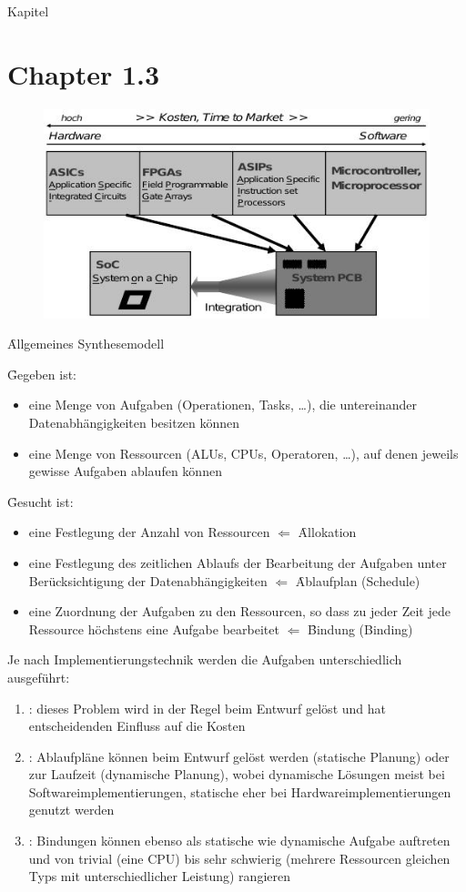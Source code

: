 \begin{chapter}{Kapitel}
\section*{Chapter 1.3}
\begin{figure}[!ht]
 \centering
 \includegraphics[scale=0.7]{pics/implementierung}
\end{figure}

\f{Allgemeines Synthesemodell}

\noindent \f{Gegeben ist:}
\begin{itemize}
 \item eine Menge von Aufgaben (Operationen, Tasks, \dots), die untereinander Datenabhängigkeiten besitzen können
 \item eine Menge von Ressourcen (ALUs, CPUs, Operatoren, \dots), auf denen jeweils gewisse Aufgaben ablaufen können 
\end{itemize}

\f{Gesucht ist:}
\begin{itemize}
 \item eine Festlegung der Anzahl von Ressourcen $\Leftarrow$ \f{Allokation}
 \item eine Festlegung des zeitlichen Ablaufs der Bearbeitung der Aufgaben unter Berücksichtigung der Datenabhängigkeiten $\Leftarrow$ \f{Ablaufplan (Schedule)}
 \item eine Zuordnung der Aufgaben zu den Ressourcen, so dass zu jeder Zeit jede Ressource höchstens eine Aufgabe bearbeitet $\Leftarrow$ \f{Bindung (Binding)}
\end{itemize}

Je nach Implementierungstechnik werden die Aufgaben unterschiedlich ausgeführt:
\begin{enumerate}
 \item {}: dieses Problem wird in der Regel beim Entwurf gelöst und hat entscheidenden Einfluss auf die Kosten 
 \item {}: Ablaufpläne können beim Entwurf gelöst werden (statische Planung) oder zur Laufzeit (dynamische Planung), wobei dynamische Lösungen meist
 bei Softwareimplementierungen, statische eher bei Hardwareimplementierungen genutzt werden 
 \item {}: Bindungen können ebenso als statische wie dynamische Aufgabe auftreten und von trivial (eine CPU) bis sehr schwierig (mehrere Ressourcen 
 gleichen Typs mit unterschiedlicher Leistung) rangieren
\end{enumerate}


\end{chapter}

